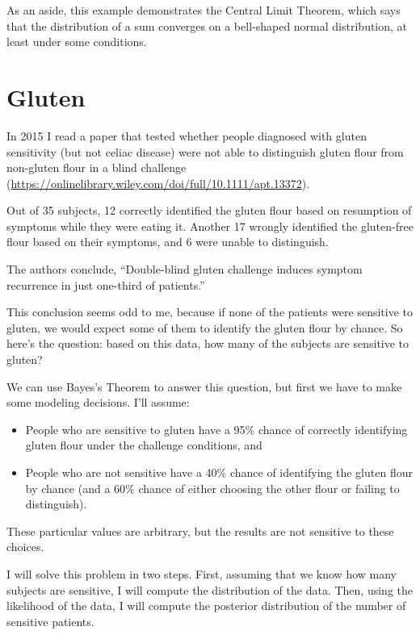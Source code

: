 \documentclass[12pt]{book}
\theoremstyle{exercise}
\begin{document}
As an aside, this example demonstrates the Central Limit Theorem, which says that the distribution of a sum converges on a bell-shaped normal distribution, at least under some conditions.

\section{Gluten}

In 2015 I read a paper that tested whether people diagnosed with gluten sensitivity (but not celiac disease) were not able to distinguish gluten flour from non-gluten flour in a blind challenge (\url{https://onlinelibrary.wiley.com/doi/full/10.1111/apt.13372}).

Out of 35 subjects, 12 correctly identified the gluten flour based on resumption of symptoms while they were eating it.  Another 17 wrongly identified the gluten-free flour based on their symptoms, and 6 were unable to distinguish.

The authors conclude, ``Double-blind gluten challenge induces symptom recurrence in just one-third of patients.''

This conclusion seems odd to me, because if none of the patients were sensitive to gluten, we would expect some of them to identify the gluten flour by chance.
So here's the question: based on this data, how many of the subjects are sensitive to gluten?

We can use Bayes's Theorem to answer this question, but first we have to make some modeling decisions.
I'll assume:

\begin{itemize}

\item People who are sensitive to gluten have a 95\% chance of correctly identifying gluten flour under the challenge conditions, and

\item People who are not sensitive have a 40\% chance of identifying the gluten flour by chance (and a 60\% chance of either choosing the other flour or failing to distinguish).

\end{itemize}

These particular values are arbitrary, but the results are not sensitive to these choices.

I will solve this problem in two steps.  First, assuming that we know how many subjects are sensitive, I will compute the distribution of the data.  Then, using the likelihood of the data, I will compute the posterior distribution of the number of sensitive patients.
\end{document}
